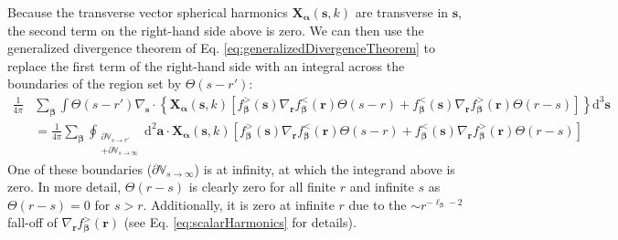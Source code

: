 \documentclass{article}
\begin{document}
Because the transverse vector spherical harmonics $\mathbf{X}_{\bm{\alpha}}(\mathbf{s},k)$ are transverse in $\mathbf{s}$, the second term on the right-hand side above is zero. We can then use the generalized divergence theorem of Eq. \eqref{eq:generalizedDivergenceTheorem} to replace the first term of the right-hand side with an integral across the boundaries of the region set by $\Theta(s - r')$:
\begin{equation}
\begin{split}
\frac{1}{4\pi}&\sum_{\bm{\beta}}\int\Theta(s - r')\nabla_{\mathbf{s}}\cdot\left\{\mathbf{X}_{\bm{\alpha}}(\mathbf{s},k)\left[f_{\bm{\beta}}^>(\mathbf{s})\nabla_{\mathbf{r}}f_{\bm{\beta}}^<(\mathbf{r})\Theta(s - r) + f_{\bm{\beta}}^<(\mathbf{s})\nabla_{\mathbf{r}}f_{\bm{\beta}}^>(\mathbf{r})\Theta(r - s)\right]\right\}\mathrm{d}^3\mathbf{s}\\
&= \frac{1}{4\pi}\sum_{\bm{\beta}}\oint_{\substack{\partial\mathbb{V}_{s\to r'}\\ + \partial\mathbb{V}_{s\to\infty}}}\mathrm{d}^2\mathbf{a}\cdot\mathbf{X}_{\bm{\alpha}}(\mathbf{s},k)\left[f_{\bm{\beta}}^>(\mathbf{s})\nabla_{\mathbf{r}}f_{\bm{\beta}}^<(\mathbf{r})\Theta(s - r) + f_{\bm{\beta}}^<(\mathbf{s})\nabla_{\mathbf{r}}f_{\bm{\beta}}^>(\mathbf{r})\Theta(r - s)\right]
\end{split}
\end{equation}
One of these boundaries ($\partial\mathbb{V}_{s\to\infty}$) is at infinity, at which the integrand above is zero. In more detail, $\Theta(r - s)$ is clearly zero for all finite $r$ and infinite $s$ as $\Theta(r - s) = 0$ for $s > r$. Additionally, it is zero at infinite $r$ due to the $\sim r^{-\ell_{\bm{\beta}} - 2}$ fall-off of $\nabla_{\mathbf{r}}f_{\bm{\beta}}^>(\mathbf{r})$ (see Eq. \eqref{eq:scalarHarmonics} for details). 
\end{document}
